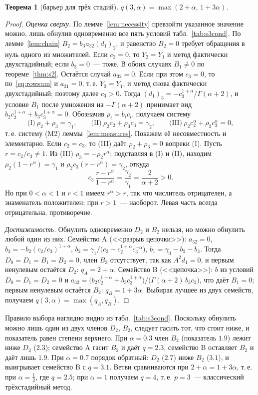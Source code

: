 \documentclass[11pt,a4paper]{article}
\theoremstyle{plain}
\newtheorem{theorem}{Теорема}
\theoremstyle{definition}
\newcommand{\G}{\Gamma}
\begin{document}
\begin{theorem}[барьер для трёх стадий]\label{thm:s3}
$q(3,\alpha)=\max(2+\alpha,\,1+3\alpha)$.
\end{theorem}
\begin{proof}
\emph{Оценка сверху.} По лемме~\ref{lem:necessity} превзойти указанное значение можно, лишь обнулив одновременно все пять условий табл.~\ref{tab:s3cond}. По лемме~\ref{lem:chain} $B_2=b_3a_{32}(d_1)_2$, и равенство $B_2=0$ требует обращения в нуль одного из множителей. Если $c_2=0$, то $Y_2=Y_1$ и метод фактически двухстадийный; если $b_3=0$~--- тоже. В обоих случаях $B_1\neq0$ по теореме~\ref{thm:s2}. Остаётся случай $a_{32}=0$. Если при этом $c_3=0$, то по~\eqref{eq:rowsum} и $a_{31}=0$, т.\,е. $Y_3=Y_1$, и метод снова фактически двухстадийный; поэтому далее $c_3>0$. Тогда $(d_1)_3=-c_3^{1+\alpha}/\G(\alpha+2)$, и условие $B_1$ после умножения на $-\G(\alpha+2)$ принимает вид $b_2c_2^{1+\alpha}+b_3c_3^{1+\alpha}=0$. Обозначив $\rho_i=b_ic_i$, получаем систему
\[
\text{(I)}\ \rho_2+\rho_3=\gamma_1,\qquad \text{(II)}\ \rho_2c_2+\rho_3c_3=\gamma_2,\qquad \text{(III)}\ \rho_2c_2^{\alpha}+\rho_3c_3^{\alpha}=0,
\]
т.\,е. систему (M2) леммы~\ref{lem:measures}. Покажем её несовместность и элементарно. Если $c_2=c_3$, то (III) даёт $\rho_2+\rho_3=0$ вопреки (I). Пусть $r=c_2/c_3\neq1$. Из (III) $\rho_3=-\rho_2r^{\alpha}$; подставляя в (I) и (II), находим $\rho_2(1-r^{\alpha})=\gamma_1$ и $\rho_2c_3(r-r^{\alpha})=\gamma_2$, откуда
\[
c_3\,\frac{r-r^{\alpha}}{1-r^{\alpha}}=\frac{\gamma_2}{\gamma_1}=\frac{2}{\alpha+2}>0 .
\]
Но при $0<\alpha<1$ и $r<1$ имеем $r^{\alpha}>r$, так что числитель отрицателен, а знаменатель положителен; при $r>1$~--- наоборот. Левая часть всегда отрицательна, противоречие.

\emph{Достижимость.} Обнулить одновременно $D_2$ и $B_2$ нельзя, но можно обнулить любой один из них.
Семейство A (<<разрыв цепочки>>): $a_{32}=0$, $b_3=-b_2(c_2/c_3)^{1+\alpha}$, $b_2=\gamma_1/\bigl(c_2-c_2^{1+\alpha}c_3^{-\alpha}\bigr)$, $b_1=\gamma_0-b_2-b_3$. Тогда $D_0=D_1=B_1=B_2=0$, член $B_3$ отсутствует, так как $A^2d_1=0$, и первым ненулевым остаётся $D_2$: $q_A=2+\alpha$.
Семейство B (<<цепочка>>): $b$ из условий $D_0=D_1=D_2=0$ и $a_{32}=\bigl(b_2c_2^{1+\alpha}+b_3c_3^{1+\alpha}\bigr)/\bigl(\G(\alpha+2)\,b_3c_2\bigr)$, что даёт $B_1=0$; первым ненулевым остаётся $B_2$: $q_B=1+3\alpha$.
Выбирая лучшее из двух семейств, получаем $q(3,\alpha)=\max(q_A,q_B)$.
\end{proof}

Правило выбора наглядно видно из табл.~\ref{tab:s3cond}. Поскольку обнулить можно лишь один из двух членов $D_2$, $B_2$, следует гасить тот, что стоит ниже, и показатель равен степени верхнего. При $\alpha=0.3$ член $B_2$ (показатель $1.9$) лежит ниже $D_2$ ($2.3$); семейство A гасит $B_2$ и даёт $q=2.3$, семейство B оставляет $B_2$ и даёт лишь $1.9$. При $\alpha=0.7$ порядок обратный: $D_2$ ($2.7$) ниже $B_2$ ($3.1$), и выигрывает семейство B с $q=3.1$. Ветви сравниваются при $2+\alpha=1+3\alpha$, т.\,е. при $\alpha=\frac12$, где $q=2.5$; при $\alpha=1$ получаем $q=4$, т.\,е. $p=3$~--- классический трёхстадийный метод.
\end{document}
